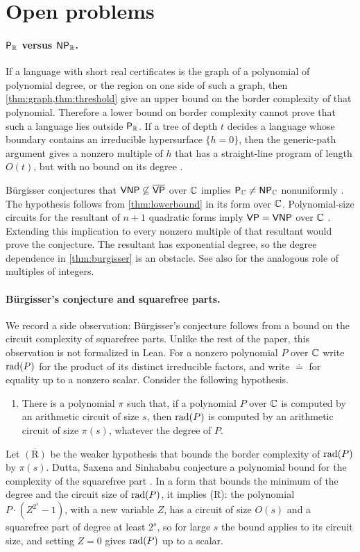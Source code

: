 \section{Open problems}\label{sec:open}

\paragraph{$\textsf{\upshape P}_{\mathbb{R}}$ versus $\textsf{\upshape NP}_{\mathbb{R}}$.} If a language with short real certificates is the graph of a polynomial of polynomial degree, or the region on one side of such a graph, then \cref{thm:graph,thm:threshold} give an upper bound on the border complexity of that polynomial. Therefore a lower bound on border complexity cannot prove that such a language lies outside $\textsf{\upshape P}_{\mathbb{R}}$. If a tree of depth $t$ decides a language whose boundary contains an irreducible hypersurface $\{h=0\}$, then the generic-path argument gives a nonzero multiple of $h$ that has a straight-line program of length $O(t)$, but with no bound on its degree \cite{Bur04}.

B\"urgisser conjectures that $\textsf{\upshape VNP}\not\subseteq\overline{\textsf{\upshape VP}}$ over $\mathbb{C}$ implies $\textsf{\upshape P}_{\mathbb{C}}\ne\textsf{\upshape NP}_{\mathbb{C}}$ nonuniformly \cite[Conjecture~1.1]{Bur26}. The hypothesis follows from \cref{thm:lowerbound} in its form over $\mathbb{C}$. Polynomial-size circuits for the resultant of $n+1$ quadratic forms imply $\textsf{\upshape VP}=\textsf{\upshape VNP}$ over $\mathbb{C}$ \cite{Bur26}. Extending this implication to every nonzero multiple of that resultant would prove the conjecture. The resultant has exponential degree, so the degree dependence in \cref{thm:burgisser} is an obstacle. See also \cite{SS95} for the analogous role of multiples of integers.

\paragraph{B\"urgisser's conjecture and squarefree parts.} We record a side observation: B\"urgisser's conjecture follows from a bound on the circuit complexity of squarefree parts. Unlike the rest of the paper, this observation is not formalized in Lean. For a nonzero polynomial $P$ over $\mathbb{C}$ write $\operatorname{rad}(P)$ for the product of its distinct irreducible factors, and write $\doteq$ for equality up to a nonzero scalar. Consider the following hypothesis.
\begin{enumerate}[label=\textup{(R)},leftmargin=3em]
\item There is a polynomial $\pi$ such that, if a polynomial $P$ over $\mathbb{C}$ is computed by an arithmetic circuit of size $s$, then $\operatorname{rad}(P)$ is computed by an arithmetic circuit of size $\pi(s)$, whatever the degree of $P$.
\end{enumerate}
Let $\overline{\mathrm{(R)}}$ be the weaker hypothesis that bounds the border complexity of $\operatorname{rad}(P)$ by $\pi(s)$. Dutta, Saxena and Sinhababu conjecture a polynomial bound for the complexity of the squarefree part \cite[Conjecture~1]{DSS22}. In a form that bounds the minimum of the degree and the circuit size of $\operatorname{rad}(P)$, it implies \textup{(R)}: the polynomial $P\cdot(Z^{2^s}-1)$, with a new variable $Z$, has a circuit of size $O(s)$ and a squarefree part of degree at least $2^s$, so for large $s$ the bound applies to its circuit size, and setting $Z=0$ gives $\operatorname{rad}(P)$ up to a scalar.

